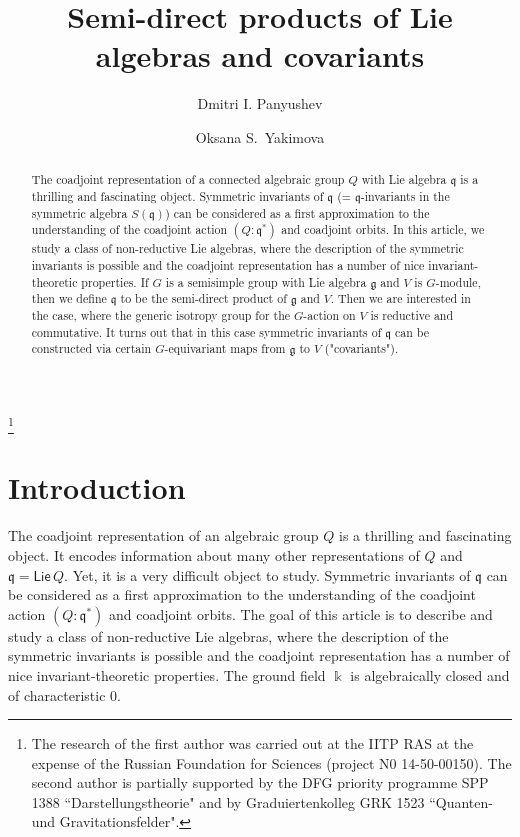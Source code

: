 \title{Semi-direct products of Lie algebras and covariants}
\author{Dmitri I. Panyushev}
\address[D.P.]{Institute for Information Transmission Problems of the R.A.S, Bolshoi Karetnyi per. 19, 
Moscow 127051, Russia}
\author[O.\,Yakimova]{Oksana S.~Yakimova}
\address[O.Y.]{Institut f\"ur Mathematik, Friedrich-Schiller-Universit\"at Jena,  07737 Jena, 
Deutschland}
\thanks{The research of the first author was carried out at the IITP RAS at the expense of the Russian Foundation for Sciences (project {{\tencyr\cyracc} N0} 14-50-00150).  The second author is partially supported by the DFG priority programme SPP 1388 
``Darstellungstheorie" and by Graduiertenkolleg GRK 1523 ``Quanten- und Gravitationsfelder".}
\begin{abstract}
The coadjoint representation of a connected algebraic group $Q$ with Lie algebra ${{\mathfrak q}}$ is a thrilling and fascinating object. Symmetric invariants of ${{\mathfrak q}}$ (= ${{\mathfrak q}}$-invariants in the symmetric algebra $S({{\mathfrak q}})$) can be considered as a first approximation to the understanding of the coadjoint action $(Q:{{\mathfrak q}}^*)$ and coadjoint orbits. In this article, we study a class of non-reductive Lie algebras, where the description of the symmetric invariants is possible and the coadjoint representation has a number of nice invariant-theoretic properties. If $G$ is a semisimple group with Lie algebra ${{\mathfrak g}}$ and $V$ is $G$-module, then we define ${{\mathfrak q}}$ to be the semi-direct product of ${{\mathfrak g}}$ and $V$. Then we are interested in the case, where the generic isotropy group for the $G$-action on $V$ is reductive and commutative. It turns out that in this case symmetric invariants of ${{\mathfrak q}}$ can be constructed via certain $G$-equivariant maps from ${{\mathfrak g}}$ to $V$ ("covariants").

\end{abstract}
\maketitle

\section*{Introduction}

\noindent
The coadjoint representation of an algebraic group $Q$ is a thrilling and fascinating object. It encodes 
information about many other representations of $Q$ and ${{\mathfrak q}}={{\mathsf{Lie\,}}} Q$. Yet, it is a very difficult object to 
study.  Symmetric invariants of ${{\mathfrak q}}$ can be considered as a first approximation to the understanding of 
the coadjoint action $(Q:{{\mathfrak q}}^*)$ 
and coadjoint orbits. The goal of this article is to describe and study a class of non-reductive Lie algebras, 
where the description of the symmetric invariants is possible and the 
coadjoint representation has a number of nice invariant-theoretic properties. The ground field ${\Bbbk}$ is algebraically closed and of characteristic $0$.

